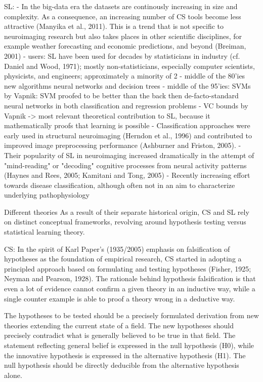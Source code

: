 \documentclass[authoryear,review,3p]{elsarticle}
\begin{document}
SL:
- In the big-data era the datasets are continously increasing in size and complexity. As a consequence, an increasing number of CS tools become less attractive (Manyika et al., 2011). This is a trend that is not specific to neuroimaging research but also takes places in other scientific disciplines, for example weather forecasting and economic predictions, and beyond (Breiman, 2001)
- users: SL have been used for decades by statisticians in industry (cf. Daniel and Wood, 1971); mostly non-statisticians, especially computer scientists, physicists, and engineers; approximately a minority of 2%
- middle of the 80'ies new algorithms neural networks and decision trees
- middle of the 95'ies: SVMs by Vapnik: SVM proofed to be better than the back then de-facto-standard neural networks in both classification and regression problems
- VC bounds by Vapnik -> most relevant theoretical contribution to SL, because it mathematically proofs that learning is possible
- Classification approaches were early used in structural neuroimaging (Herndon et al., 1996) and contributed to improved image preprocessing performance (Ashburner and Friston, 2005).
- Their popularity of SL in neuroimaging increased dramatically in the attempt of "mind-reading" or "decoding" cognitive processes from neural activity patterns (Haynes and Rees, 2005; Kamitani and Tong, 2005)
- Recently increasing effort towards disease classification, although often not in an aim to characterize underlying pathophysiology

Different theories
As a result of their separate historical origin, CS and SL rely on distinct conceptual frameworks, revolving around hypothesis testing versus statistical learning theory.

CS:
In the spirit of Karl Paper's (1935/2005) emphasis on falsification of hypotheses as the foundation of empirical research, CS started in adopting a principled approach based on formulating and testing hypotheses (Fisher, 1925; Neyman and Pearson, 1928). The rationale behind hypothesis falsification is that even a lot of evidence cannot confirm a given theory in an inductive way, while a single counter example is able to proof a theory wrong in a deductive way.

The hypotheses to be tested should be a precisely formulated derivation from new theories extending the current state of a field. The new hypotheses should precisely contradict what is generally believed to be true in that field. The statement reflecting general belief is expressed in the null hypothesis (H0), while the innovative hypothesis is expressed in the alternative hypothesis (H1). The null hypothesis should be directly deducible from the alternative hypothesis alone.
\end{document}
